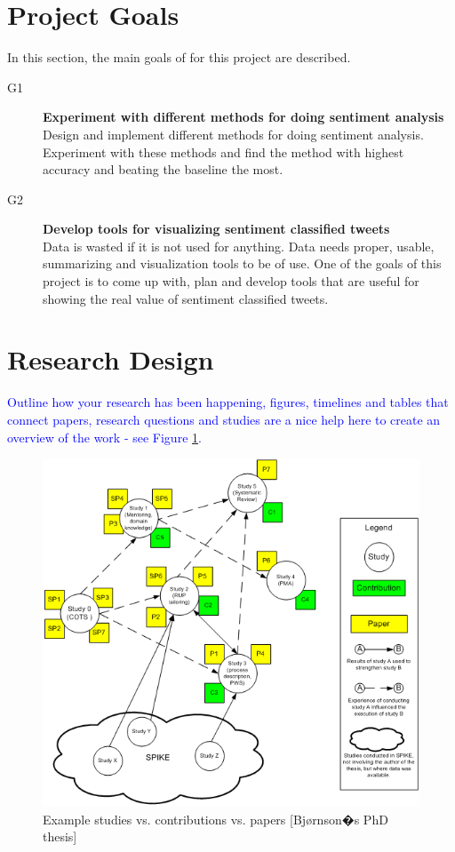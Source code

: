 \section{Project Goals}
\label{sec:projectgoals}

In this section, the main goals of for this project are described.

\begin{description}

\item[G1] \textbf{Experiment with different methods for doing sentiment analysis} \\
	Design and implement different methods for doing sentiment analysis. Experiment with these methods and find the method with highest accuracy and beating the baseline the most. 
	
\item[G2] \textbf{Develop tools for visualizing sentiment classified tweets} \\
    Data is wasted if it is not used for anything. Data needs proper, usable, summarizing and visualization tools to be of use. One of the goals of this project is to come up with, plan and develop tools that are useful for showing the real value of sentiment classified tweets. 

\end{description}


\section{Research Design}
\label{sec:design}

\textcolor{blue}{Outline how your research has been happening, figures, timelines and tables that connect papers, 
research questions and studies are a nice help here to create an overview of the work - see Figure
\ref{fig:1-studies_contributions_papers}.}


\begin{figure}
\begin{center}
\includegraphics[width=.75\textwidth]{../img/1-studies_contributions_papers} \caption[Example studies vs. contributions 
vs. papers]{Example studies vs. contributions vs. papers [Bj{\o}rnson�s PhD thesis]}
\label{fig:1-studies_contributions_papers} 
\end{center}
\end{figure}


